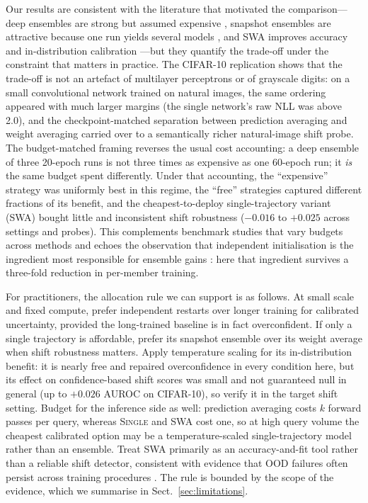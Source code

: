 \documentclass[11pt,a4paper]{article}
\newcommand{\swa}{\textsc{SWA}}
\newcommand{\single}{\textsc{Single}}
\begin{document}
Our results are consistent with the literature that motivated the
comparison---deep ensembles are strong but assumed expensive
\citep{lakshminarayanan2017,fort2019}, snapshot ensembles are attractive
because one run yields several models \citep{huang2017}, and \swa{}
improves accuracy and in-distribution calibration
\citep{izmailov2018,wilson2020,ajroldi2025}---but they quantify the
trade-off under the constraint that matters in practice. The CIFAR-10
replication shows that the trade-off is not an artefact of multilayer
perceptrons or of grayscale digits: on a small convolutional network
trained on natural images, the same ordering appeared with much larger
margins (the single network's raw NLL was above 2.0), and
the checkpoint-matched separation between prediction averaging and weight
averaging carried over to a semantically richer natural-image shift probe.
The budget-matched framing reverses the usual
cost accounting: a deep ensemble of three 20-epoch runs
is not three times as expensive as one 60-epoch run; it \emph{is} the same
budget spent differently. Under that accounting, the ``expensive''
strategy was uniformly best in this regime, the ``free'' strategies
captured different fractions of its benefit, and the cheapest-to-deploy
single-trajectory variant (\swa{}) bought little and inconsistent shift
robustness ($-0.016$ to $+0.025$ across settings and probes). This
complements benchmark studies that vary budgets across methods
\citep{ovadia2019,ashukha2020} and echoes the observation that
independent initialisation is the ingredient most responsible for
ensemble gains \citep{fort2019}: here that ingredient survives a
three-fold reduction in per-member training.

For practitioners, the allocation rule we can support is as follows. At
small scale and fixed compute, prefer independent restarts over longer
training for calibrated uncertainty, provided the long-trained baseline is
in fact overconfident. If only a single trajectory is affordable,
prefer its snapshot ensemble over its weight average when shift robustness
matters. Apply temperature scaling for its in-distribution benefit: it is
nearly free and repaired overconfidence in every condition here, but its
effect on confidence-based shift scores was small and not guaranteed null
in general (up to $+0.026$ AUROC on CIFAR-10), so verify it in the target
shift setting. Budget for the inference side as well: prediction averaging
costs $k$ forward passes per query, whereas \single{} and \swa{} cost one,
so at high query volume the cheapest calibrated option may be a
temperature-scaled single-trajectory model rather than an ensemble. Treat
\swa{} primarily as an accuracy-and-fit tool rather than a reliable shift
detector, consistent
with evidence that OOD failures often persist across training procedures
\citep{hendrycks2017,nguyen2015}. The rule is
bounded by the scope of the evidence, which we summarise in
Sect.~\ref{sec:limitations}.
\end{document}
